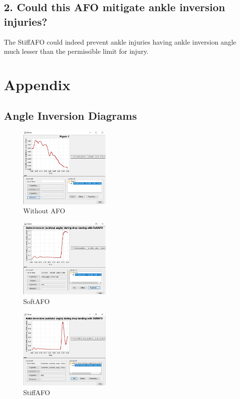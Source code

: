\documentclass[a4paper,oneside,11pt]{report}
\begin{document}
\subsection*{2. Could this AFO mitigate ankle inversion injuries?}
The StiffAFO could indeed prevent ankle injuries having ankle inversion angle much lesser than the permissible limit for injury. 
\section*{Appendix}
\subsection*{Angle Inversion Diagrams}
\begin{figure}[htb]
	\includegraphics[width=0.4\textwidth]{ME603-MSK-PartOne.JPG}
	\caption{Without AFO}
	\label{fig:WithoutAFO}
\end{figure}
\begin{figure}[htb]
	\includegraphics[width=0.4\textwidth]{ME603-MSK-SoftAFO.JPG}
	\caption{SoftAFO}
	\label{fig:SoftAFO}
\end{figure}
\begin{figure}[htb]
	\includegraphics[width=0.4\textwidth]{ME603-MSK-StiffAFO.JPG}
	\caption{StiffAFO}
	\label{fig:StiffAFO}
\end{figure}
\end{document}
